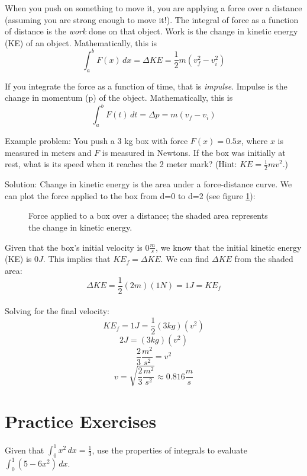 When you push on something to move it, you are applying a force over 
a distance (assuming you are strong enough to move it!). The integral 
of force as a function of distance is the \textit{work} done on that 
object.  Work is the change in kinetic energy (KE) of an object. 
Mathematically, this is $$\int_{a}^{b} F(x)\,dx = \Delta KE = 
\frac{1}{2} m (v_f^2 - v_i^2)$$

If you integrate the force as a function of time, that is 
\textit{impulse}. Impulse is the change in momentum (p) of the 
object. Mathematically, this is $$\int_{a}^{b} F(t)\,dt = \Delta p 
= m (v_f - v_i)$$

Example problem: You push a 3 kg box with force $F(x) = 0.5x$, where 
$x$ is measured in meters and $F$ is measured in Newtons. If the box 
was initially at rest, what is its speed when it reaches the 2 meter 
mark? (Hint: $KE = \frac{1}{2} m v^2$.) 

Solution: Change in kinetic energy is the area under a force-distance 
curve. We can plot the force applied to the box from d=0 to d=2 (see 
figure \ref{fig:KEbox}):

\begin{figure}[htbp]
 \caption{Force applied to a box over a distance; the shaded area 
 represents the change in kinetic energy.}
 \label{fig:KEbox}
\end{figure}

Given that the box's initial velocity is $0 \frac{m}{s}$, we know that 
the initial kinetic energy (KE) is $0J$. This implies that $KE_f = 
\Delta KE$. We can find $\Delta KE$ from the shaded area:\\
$$\Delta KE = \frac{1}{2} (2m) (1N) = 1 J = KE_f$$\\
Solving for the final velocity:\\
$$KE_f = 1 J = \frac{1}{2}(3kg)(v^2)$$
$$2 J = (3 kg) (v^2)$$
$$\frac{2}{3} \frac{m^2}{s^2} = v^2$$
$$v=\sqrt{\frac{2}{3} \frac{m^2}{s^2}} \approx 0.816 \frac{m}{s}$$


\section{Practice Exercises}
\begin{Exercise}[label=defint2]
Given that $\int_{0}^{1} x^2\,dx = \frac{1}{3}$, use the properties 
of integrals to evaluate $\int_{0}^{1} (5-6x^2)\,dx$. 
\end{Exercise}

